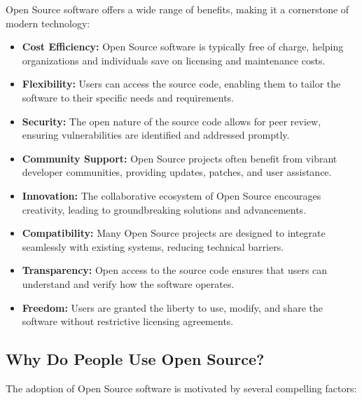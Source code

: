 Open Source software offers a wide range of benefits, making it a cornerstone of modern technology:

\begin{itemize}
    \item \textbf{Cost Efficiency:} Open Source software is typically free of charge, helping organizations and individuals save on licensing and maintenance costs.
    \item \textbf{Flexibility:} Users can access the source code, enabling them to tailor the software to their specific needs and requirements.
    \item \textbf{Security:} The open nature of the source code allows for peer review, ensuring vulnerabilities are identified and addressed promptly.
    \item \textbf{Community Support:} Open Source projects often benefit from vibrant developer communities, providing updates, patches, and user assistance.
    \item \textbf{Innovation:} The collaborative ecosystem of Open Source encourages creativity, leading to groundbreaking solutions and advancements.
    \item \textbf{Compatibility:} Many Open Source projects are designed to integrate seamlessly with existing systems, reducing technical barriers.
    \item \textbf{Transparency:} Open access to the source code ensures that users can understand and verify how the software operates.
    \item \textbf{Freedom:} Users are granted the liberty to use, modify, and share the software without restrictive licensing agreements.
\end{itemize}

\subsection{Why Do People Use Open Source?}

The adoption of Open Source software is motivated by several compelling factors:

